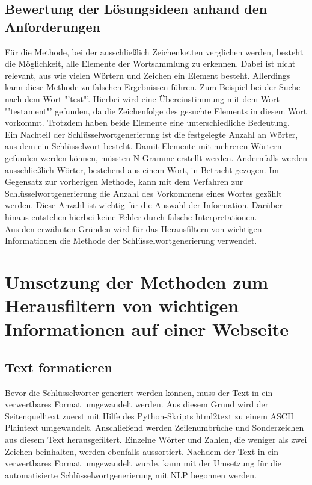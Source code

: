 	\subsection{Bewertung der Lösungsideen anhand den Anforderungen}
	Für die Methode, bei der ausschließlich Zeichenketten verglichen werden, besteht die Möglichkeit, alle Elemente der Wortsammlung zu erkennen. Dabei ist nicht relevant, aus wie vielen Wörtern und Zeichen ein Element besteht. Allerdings kann diese Methode zu falschen Ergebnissen führen. Zum Beispiel bei der Suche nach dem Wort "'test"'. Hierbei wird eine Übereinstimmung mit dem Wort "'testament"' gefunden, da die Zeichenfolge des gesuchte Elements in diesem Wort vorkommt. Trotzdem haben beide Elemente eine unterschiedliche Bedeutung. \\
	Ein Nachteil der Schlüsselwortgenerierung ist die festgelegte Anzahl an Wörter, aus dem ein Schlüsselwort besteht. Damit Elemente mit mehreren Wörtern gefunden werden können, müssten N-Gramme erstellt werden. Andernfalls werden ausschließlich Wörter, bestehend aus einem Wort, in Betracht gezogen. Im Gegensatz zur vorherigen Methode, kann mit dem Verfahren zur Schlüsselwortgenerierung die Anzahl des Vorkommens eines Wortes gezählt werden. Diese Anzahl ist wichtig für die Auswahl der Information. Darüber hinaus entstehen hierbei keine Fehler durch falsche Interpretationen.\\
	Aus den erwähnten Gründen wird für das Herausfiltern von wichtigen Informationen die Methode der Schlüsselwortgenerierung verwendet.


\section{Umsetzung der Methoden zum Herausfiltern von wichtigen Informationen auf einer Webseite}
	\subsection{Text formatieren}
	\label{subsec:TextFormatieren}
	Bevor die Schlüsselwörter generiert werden können, muss der Text in ein verwertbares Format umgewandelt werden. Aus diesem Grund wird der Seitenquelltext zuerst mit Hilfe des Python-Skripts html2text zu einem ASCII Plaintext umgewandelt.\cite{html2text} Anschließend werden Zeilenumbrüche und Sonderzeichen aus diesem Text herausgefiltert. Einzelne Wörter und Zahlen, die weniger als zwei Zeichen beinhalten, werden ebenfalls aussortiert. Nachdem der Text in ein verwertbares Format umgewandelt wurde, kann mit der Umsetzung für die automatisierte Schlüsselwortgenerierung mit NLP begonnen werden.
	
